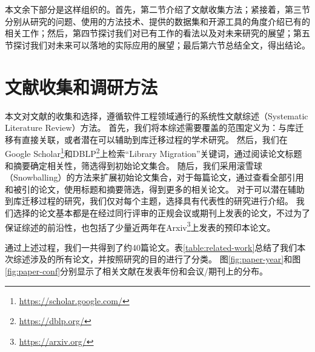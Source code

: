 \documentclass[UTF8]{ctexart}
\begin{document}
本文余下部分是这样组织的。首先，第二节介绍了文献收集方法；紧接着，第三节分别从研究的问题、使用的方法技术、提供的数据集和开源工具的角度介绍已有的相关工作；然后，第四节探讨我们对已有工作的看法以及对未来研究的展望；第五节探讨我们对未来可以落地的实际应用的展望；最后第六节总结全文，得出结论。

\section{文献收集和调研方法}
\label{section:survey-method}

本文对文献的收集和选择，遵循软件工程领域通行的系统性文献综述（Systematic Literature Review）方法\cite{2006ICSE-Budgen-Performing, 2007JournalSysAndSoft-Brereton-Lessons, 2014EASE-Wohlin-Guidelines, 2018EMSE-Ribeiro-Challenges}。
首先，我们将本综述需要覆盖的范围定义为：与库迁移有直接关联，或者潜在可以辅助到库迁移过程的学术研究。
然后，我们在Google Scholar\footnote{\url{https://scholar.google.com/}}和DBLP\footnote{\url{https://dblp.org/}}上检索“Library Migration”关键词，通过阅读论文标题和摘要确定相关性，筛选得到初始论文集合。
随后，我们采用滚雪球（Snowballing）的方法来扩展初始论文集合\cite{2014EASE-Wohlin-Guidelines}，对于每篇论文，通过查看全部引用和被引的论文，使用标题和摘要筛选，得到更多的相关论文。
对于可以潜在辅助到库迁移过程的研究，我们仅对每个主题，选择具有代表性的研究进行介绍。
我们选择的论文基本都是在经过同行评审的正规会议或期刊上发表的论文，不过为了保证综述的前沿性，也包括了少量近两年在Arxiv\footnote{\url{https://arxiv.org/}}上发表的预印本论文。

通过上述过程，我们一共得到了约40篇论文。表\ref{table:related-work}总结了我们本次综述涉及的所有论文，并按照研究的目的进行了分类。
图\ref{fig:paper-year}和图\ref{fig:paper-conf}分别显示了相关文献在发表年份和会议/期刊上的分布。
\end{document}
